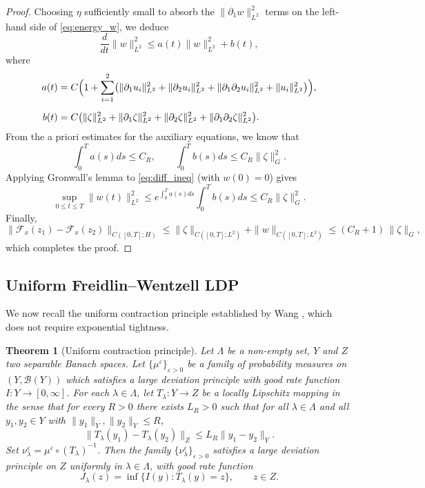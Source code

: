\documentclass[11pt,a4paper,reqno]{amsart}
\newtheorem{theorem}{Theorem}[section]
\theoremstyle{definition}
\begin{document}
\begin{proof}
  Choosing $\eta$ sufficiently small to absorb the $\|\partial_1 w\|_{L^2}^2$
  terms on the left-hand side of \eqref{eq:energy_w}, we deduce
  \begin{equation}\label{eq:diff_ineq}
    \frac{d}{dt}\|w\|_{L^2}^2 \le a(t) \|w\|_{L^2}^2 + b(t),
  \end{equation}
  where
  \begin{align*}
    a(t) &= C\Bigl(1+\sum_{i=1}^2\bigl(\|\partial_1 u_i\|_{L^2}^2
          +\|\partial_2 u_i\|_{L^2}^2+\|\partial_1\partial_2 u_i\|_{L^2}^2
          +\|u_i\|_{L^2}^2\bigr)\Bigr),\\[2mm]
    b(t) &= C\bigl(\|\zeta\|_{L^2}^2 + \|\partial_1\zeta\|_{L^2}^2
          + \|\partial_2\zeta\|_{L^2}^2 + \|\partial_1\partial_2\zeta\|_{L^2}^2\bigr).
  \end{align*}
  From the a priori estimates for the auxiliary equations, we know that
  \[
    \int_0^T a(s)ds \le C_R, \qquad
    \int_0^T b(s)ds \le C_R \|\zeta\|_G^2 .
  \]
  Applying Gronwall's lemma to \eqref{eq:diff_ineq} (with $w(0)=0$) gives
  \[
    \sup_{0\le t\le T}\|w(t)\|_{L^2}^2 \le e^{\int_0^T a(s)ds} \int_0^T b(s)ds
    \le C_R \|\zeta\|_G^2 .
  \]
  Finally,
  \[
    \|\mathcal F_x(z_1)-\mathcal F_x(z_2)\|_{C([0,T];H)}
    \le \|\zeta\|_{C([0,T];L^2)} + \|w\|_{C([0,T];L^2)}
    \le (C_R+1)\,\|\zeta\|_G,
  \]
  which completes the proof.
\end{proof}



\subsection{Uniform Freidlin--Wentzell LDP}
\label{sec:FW}
We now recall the uniform contraction principle established by Wang \cite{Wang2023},
which does not require exponential tightness.

\begin{theorem}[Uniform contraction principle]\label{th:Wang}
  Let $\Lambda$ be a non-empty set, $Y$ and $Z$ two separable Banach spaces.
  Let $\{\mu^\varepsilon\}_{\varepsilon>0}$ be a family of probability measures on
  $(Y,\mathcal B(Y))$ which satisfies a large deviation principle with good rate
  function $I:Y\to[0,\infty]$.
  For each $\lambda\in\Lambda$, let $T_\lambda : Y\to Z$ be a locally Lipschitz
  mapping in the sense that for every $R>0$ there exists $L_R>0$ such that for all
  $\lambda\in\Lambda$ and all $y_1,y_2\in Y$ with $\|y_1\|_Y,\|y_2\|_Y\le R$,
  \[
    \|T_\lambda(y_1)-T_\lambda(y_2)\|_Z \le L_R \|y_1-y_2\|_Y .
  \]
  Set $\nu_\lambda^\varepsilon = \mu^\varepsilon \circ (T_\lambda)^{-1}$.
  Then the family $\{\nu_\lambda^\varepsilon\}_{\varepsilon>0}$ satisfies a large
  deviation principle on $Z$ uniformly in $\lambda\in\Lambda$, with good rate
  function
  \[
    J_\lambda(z) = \inf \{ I(y) : T_\lambda(y)=z \}, \qquad z\in Z .
  \]
\end{theorem}
\end{document}
